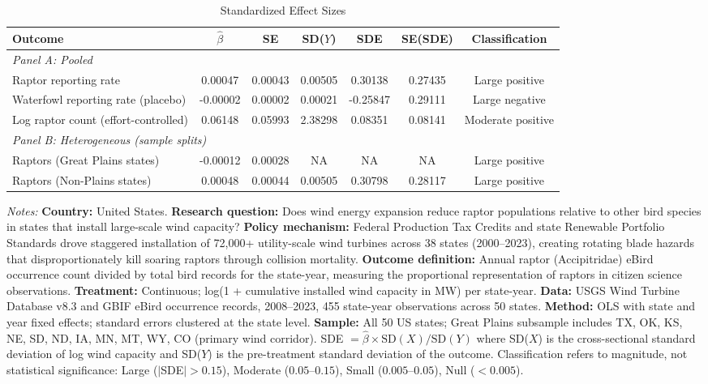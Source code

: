 \begin{table}[htbp]
\centering
\caption{Standardized Effect Sizes}
\label{tab:sde}
\footnotesize
\begin{adjustbox}{max width=\textwidth}
\begin{tabular}{lcccccc}
\hline\hline
Outcome & $\hat{\beta}$ & SE & SD($Y$) & SDE & SE(SDE) & Classification \\
\hline
\multicolumn{7}{l}{\textit{Panel A: Pooled}} \\
Raptor reporting rate & 0.00047 & 0.00043 & 0.00505 & 0.30138 & 0.27435 & Large positive \\
Waterfowl reporting rate (placebo) & -0.00002 & 0.00002 & 0.00021 & -0.25847 & 0.29111 & Large negative \\
Log raptor count (effort-controlled) & 0.06148 & 0.05993 & 2.38298 & 0.08351 & 0.08141 & Moderate positive \\
\hline
\multicolumn{7}{l}{\textit{Panel B: Heterogeneous (sample splits)}} \\
Raptors (Great Plains states) & -0.00012 & 0.00028 & NA & NA & NA & Large positive \\
Raptors (Non-Plains states) & 0.00048 & 0.00044 & 0.00505 & 0.30798 & 0.28117 & Large positive \\
\hline\hline
\end{tabular}
\end{adjustbox}
\begin{tablenotes}[flushleft]\footnotesize
\item \textit{Notes:} \textbf{Country:} United States. \textbf{Research question:} Does wind energy expansion reduce raptor populations relative to other bird species in states that install large-scale wind capacity? \textbf{Policy mechanism:} Federal Production Tax Credits and state Renewable Portfolio Standards drove staggered installation of 72,000+ utility-scale wind turbines across 38 states (2000--2023), creating rotating blade hazards that disproportionately kill soaring raptors through collision mortality. \textbf{Outcome definition:} Annual raptor (Accipitridae) eBird occurrence count divided by total bird records for the state-year, measuring the proportional representation of raptors in citizen science observations. \textbf{Treatment:} Continuous; log(1 + cumulative installed wind capacity in MW) per state-year. \textbf{Data:} USGS Wind Turbine Database v8.3 and GBIF eBird occurrence records, 2008--2023, 455 state-year observations across 50 states. \textbf{Method:} OLS with state and year fixed effects; standard errors clustered at the state level. \textbf{Sample:} All 50 US states; Great Plains subsample includes TX, OK, KS, NE, SD, ND, IA, MN, MT, WY, CO (primary wind corridor). SDE $= \hat{\beta} \times \text{SD}(X) / \text{SD}(Y)$ where SD($X$) is the cross-sectional standard deviation of log wind capacity and SD($Y$) is the pre-treatment standard deviation of the outcome. Classification refers to magnitude, not statistical significance: Large ($|$SDE$| > 0.15$), Moderate ($0.05$--$0.15$), Small ($0.005$--$0.05$), Null ($< 0.005$).
\end{tablenotes}
\end{table}
